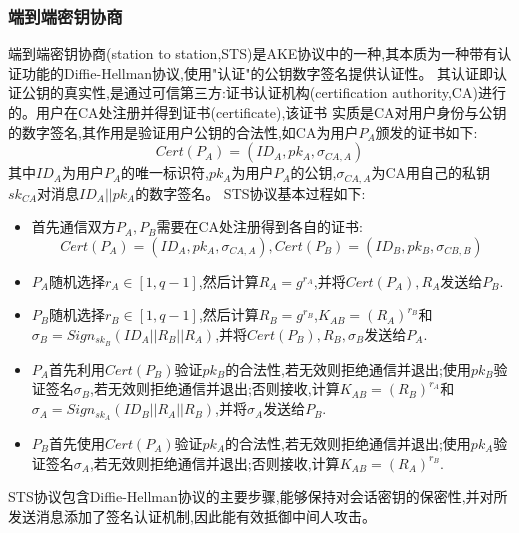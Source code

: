 \subsubsection{端到端密钥协商}
端到端密钥协商(station to station,STS)是AKE协议中的一种,其本质为一种带有认证功能的Diffie-Hellman协议,使用"认证"的公钥数字签名提供认证性。
其认证即认证公钥的真实性,是通过可信第三方:证书认证机构(certification authority,CA)进行的。用户在CA处注册并得到证书(certificate),该证书
实质是CA对用户身份与公钥的数字签名,其作用是验证用户公钥的合法性,如CA为用户$P_A$颁发的证书如下:
\[Cert(P_A) = (ID_A,pk_A,\sigma_{CA,A})\]
其中$ID_A$为用户$P_A$的唯一标识符,$pk_A$为用户$P_A$的公钥,$\sigma_{CA,A}$为CA用自己的私钥$sk_{CA}$对消息$ID_A||pk_A$的数字签名。
STS协议基本过程如下:
\begin{itemize}
    \item [0.]首先通信双方$P_A,P_B$需要在CA处注册得到各自的证书:
    \[ Cert(P_A) = (ID_A,pk_A,\sigma_{CA,A}),Cert(P_B) = (ID_B,pk_B,\sigma_{CB,B})  \]
    \item [1.]$P_A$随机选择$r_A \in [1,q-1]$,然后计算$R_A = g^{r_A}$,并将$Cert(P_A),R_A$发送给$P_B$.
    \item [2.]$P_B$随机选择$r_B \in [1,q-1]$,然后计算$R_B = g^{r_B}$,$K_{AB} = (R_A)^{r_B}$和$\sigma_B = Sign_{sk_B}(ID_A||R_B||R_A)$,并将$Cert(P_B),R_B,\sigma_B$发送给$P_A$.
    \item [3.]$P_A$首先利用$Cert(P_B)$验证$pk_B$的合法性,若无效则拒绝通信并退出;使用$pk_B$验证签名$\sigma_B$,若无效则拒绝通信并退出;否则接收,计算$K_{AB} = (R_B)^{r_A}$和$\sigma_A = Sign_{sk_A}(ID_B||R_A||R_B)$,并将$\sigma_A$发送给$P_B$.
    \item [4.]$P_B$首先使用$Cert(P_A)$验证$pk_A$的合法性,若无效则拒绝通信并退出;使用$pk_A$验证签名$\sigma_A$,若无效则拒绝通信并退出;否则接收,计算$K_{AB} = (R_A)^{r_B}$.
\end{itemize}
STS协议包含Diffie-Hellman协议的主要步骤,能够保持对会话密钥的保密性,并对所发送消息添加了签名认证机制,因此能有效抵御中间人攻击。


